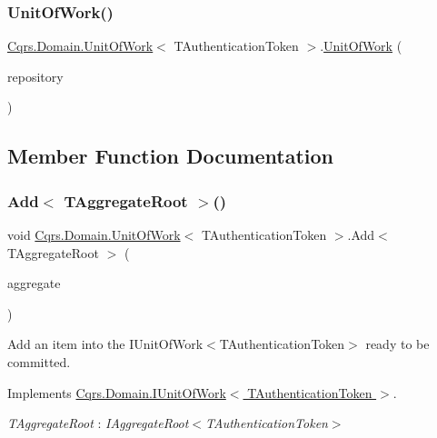 \subsubsection{\texorpdfstring{Unit\+Of\+Work()}{UnitOfWork()}}
{\footnotesize\ttfamily \hyperlink{classCqrs_1_1Domain_1_1UnitOfWork}{Cqrs.\+Domain.\+Unit\+Of\+Work}$<$ T\+Authentication\+Token $>$.\hyperlink{classCqrs_1_1Domain_1_1UnitOfWork}{Unit\+Of\+Work} (\begin{DoxyParamCaption}\item[{\hyperlink{interfaceCqrs_1_1Domain_1_1IAggregateRepository}{I\+Aggregate\+Repository}$<$ T\+Authentication\+Token $>$}]{repository }\end{DoxyParamCaption})}



\subsection{Member Function Documentation}
\mbox{\label{classCqrs_1_1Domain_1_1UnitOfWork_a840214f97d3661c7b5a739df65fadc9f}} 
\subsubsection{\texorpdfstring{Add$<$ T\+Aggregate\+Root $>$()}{Add< TAggregateRoot >()}}
{\footnotesize\ttfamily void \hyperlink{classCqrs_1_1Domain_1_1UnitOfWork}{Cqrs.\+Domain.\+Unit\+Of\+Work}$<$ T\+Authentication\+Token $>$.Add$<$ T\+Aggregate\+Root $>$ (\begin{DoxyParamCaption}\item[{T\+Aggregate\+Root}]{aggregate }\end{DoxyParamCaption})}



Add an item into the I\+Unit\+Of\+Work$<$\+T\+Authentication\+Token$>$ ready to be committed. 



Implements \hyperlink{interfaceCqrs_1_1Domain_1_1IUnitOfWork_a786ebca85b4ef7294b98280230ef1397}{Cqrs.\+Domain.\+I\+Unit\+Of\+Work$<$ T\+Authentication\+Token $>$}.

\begin{Desc}
\item[Type Constraints]\begin{description}
\item[{\em T\+Aggregate\+Root} : {\em I\+Aggregate\+Root$<$T\+Authentication\+Token$>$}]\end{description}
\end{Desc}
\mbox{\label{classCqrs_1_1Domain_1_1UnitOfWork_a7401e41dd8ce4457551c252ca6402d31}} 

